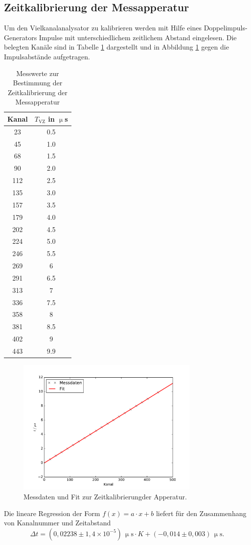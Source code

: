 \subsection{Zeitkalibrierung der Messapperatur}
Um den Vielkanalanalysator zu kalibrieren werden mit Hilfe eines Doppelimpuls-Generators Impulse mit unterschiedlichem
zeitlichem Abstand eingelesen. Die belegten Kanäle sind in Tabelle \ref{tab:Kalibrierung} dargestellt und in Abbildung \ref{fig:Kalibrierung}
gegen die Impulsabstände aufgetragen.
\begin{table}[H]
\centering
\caption{Messwerte zur Bestimmung der Zeitkalibrierung der Messapperatur}
\label{tab:Kalibrierung}
\begin{tabular}{c|c}
Kanal&$T_{\text{VZ}}$ in $\upmu$s\\
\hline
23&	0.5\\
45&	1.0\\
68&	1.5\\
90&	2.0\\
112&	2.5\\
135&	3.0\\
157&	3.5\\
179&	4.0\\
202&	4.5\\
224&	5.0\\
246&	5.5\\
269&	6\\
291&	6.5\\
313&	7\\
336&	7.5\\
358&	8\\
381&	8.5\\
402&	9\\
443&	9.9\\
\end{tabular}
\end{table}
\begin{figure}
  \centering
  \includegraphics[width=0.8\textwidth]{plots/plotKanal.pdf}
  \caption{Messdaten und Fit zur Zeitkalibrierungder Apperatur.}
  \label{fig:Kalibrierung}
\end{figure}
Die lineare Regression der Form $f(x)=a\cdot x+b$ liefert für den Zusammenhang von Kanalnummer und Zeitabstand
\begin{equation}
  \Delta t =\left(0,02238 \pm 1,4\times 10^{-5}\right)\,\upmu\text{s}\cdot K + \left(-0,014 ± 0,003\right)\,\upmu\text{s}.
  \label{eq:KanalZeit}
\end{equation}
